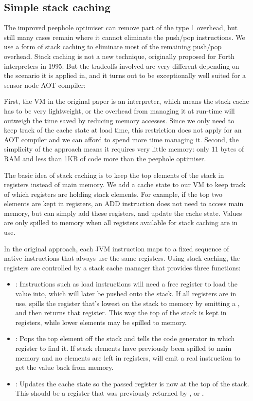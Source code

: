 \subsection{Simple stack caching}
\label{sec-optimisations-simple-stack-caching}

The improved peephole optimiser can remove part of the type 1 overhead, but still many cases remain where it cannot eliminate the push/pop instructions. We use a form of stack caching \cite{Ertl:1995dv} to eliminate most of the remaining push/pop overhead. Stack caching is not a new technique, originally proposed for Forth interpreters in 1995. But the tradeoffs involved are very different depending on the scenario it is applied in, and it turns out to be exceptionally well suited for a sensor node AOT compiler:

First, the VM in the original paper is an interpreter, which means the stack cache has to be very lightweight, or the overhead from managing it at run-time will outweigh the time saved by reducing memory accesses. Since we only need to keep track of the cache state at load time, this restriction does not apply for an AOT compiler and we can afford to spend more time managing it. Second, the simplicity of the approach means it requires very little memory: only 11 bytes of RAM and less than 1KB of code more than the peephole optimiser.

The basic idea of stack caching is to keep the top elements of the stack in registers instead of main memory. We add a cache state to our VM to keep track of which registers are holding stack elements. For example, if the top two elements are kept in registers, an ADD instruction does not need to access main memory, but can simply add these registers, and update the cache state. Values are only spilled to memory when all registers available for stack caching are in use.

In the original approach, each JVM instruction maps to a fixed sequence of native instructions that always use the same registers. Using stack caching, the registers are controlled by a stack cache manager that provides three functions:
\begin{itemize}
    \item {}: Instructions such as load instructions will need a free register to load the value into, which will later be pushed onto the stack. If all registers are in use,  spills the register that's lowest on the stack to memory by emitting a , and then returns that register. This way the top of the stack is kept in registers, while lower elements may be spilled to memory.
    \item {}: Pops the top element off the stack and tells the code generator in which register to find it. If stack elements have previously been spilled to main memory and no  elements are left in registers,  will emit a real  instruction to get the value back from memory.
    \item {}: Updates the cache state so the passed register is now at the top of the stack. This should be a register that was previously returned by , or .
\end{itemize}

